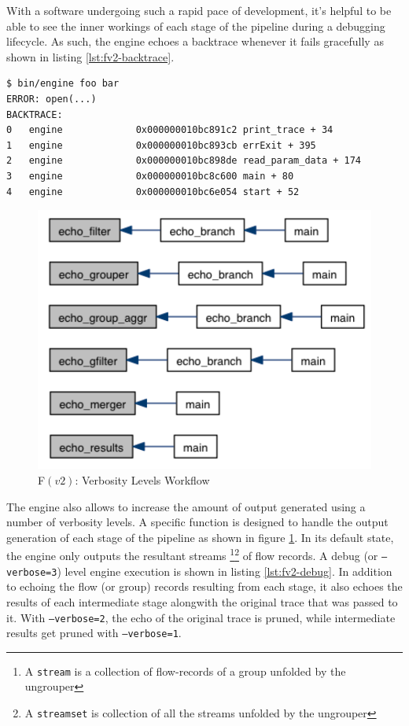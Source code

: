 With a software undergoing such a rapid pace of development, it's helpful to
be  able to see  the inner workings of
each stage of the pipeline during a debugging lifecycle. As such, the engine
echoes a backtrace whenever it fails gracefully as shown in listing
\ref{lst:fv2-backtrace}.

\begin{lstlisting}
$ bin/engine foo bar
ERROR: open(...)
BACKTRACE:
0   engine             0x000000010bc891c2 print_trace + 34
1   engine             0x000000010bc893cb errExit + 395
2   engine             0x000000010bc898de read_param_data + 174
3   engine             0x000000010bc8c600 main + 80
4   engine             0x000000010bc6e054 start + 52
\end{lstlisting}

\begin{figure}[h!]
  \begin{center}
    \includegraphics* [width=0.6\linewidth]{figures/engine-verbosity}
    \caption{F$(v2)$: Verbosity Levels Workflow}
    \label{fig:engine-verbosity}
  \end{center}
\end{figure}

The engine also allows to increase the amount of output generated using a
number of verbosity levels. A specific function is designed to handle the
output generation of each stage of the pipeline as shown in figure
\ref{fig:engine-verbosity}.  In its default state, the engine only outputs the
resultant streams \footnote{A \texttt{stream} is a collection of flow-records
of a group unfolded by the ungrouper}\footnote{A \texttt{streamset} is
collection of all the streams unfolded by the ungrouper}  of flow records. A debug (or \texttt{--verbose=3}) level
engine execution is shown in listing \ref{lst:fv2-debug}. In addition to
echoing the flow (or group) records resulting from each stage, it also echoes
the results of each intermediate stage alongwith the original trace that was
passed to it. With \texttt{--verbose=2}, the echo of the original trace is
pruned, while intermediate results get pruned with \texttt{--verbose=1}.

